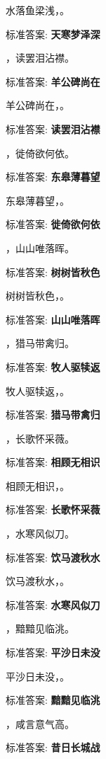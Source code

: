 \documentclass[12pt, a4paper, addpoints]{exam}
\begin{document}
\begin{questions}
\question[1] 水落鱼梁浅，\uline{\qquad\qquad\qquad}。

标准答案: \textbf{天寒梦泽深}

\question[1] \uline{\qquad\qquad\qquad}，读罢泪沾襟。

标准答案: \textbf{羊公碑尚在}

\question[1] 羊公碑尚在，\uline{\qquad\qquad\qquad}。

标准答案: \textbf{读罢泪沾襟}

\question[1] \uline{\qquad\qquad\qquad}，徙倚欲何依。

标准答案: \textbf{东皋薄暮望}

\question[1] 东皋薄暮望，\uline{\qquad\qquad\qquad}。

标准答案: \textbf{徙倚欲何依}

\question[1] \uline{\qquad\qquad\qquad}，山山唯落晖。

标准答案: \textbf{树树皆秋色}

\question[1] 树树皆秋色，\uline{\qquad\qquad\qquad}。

标准答案: \textbf{山山唯落晖}

\question[1] \uline{\qquad\qquad\qquad}，猎马带禽归。

标准答案: \textbf{牧人驱犊返}

\question[1] 牧人驱犊返，\uline{\qquad\qquad\qquad}。

标准答案: \textbf{猎马带禽归}

\question[1] \uline{\qquad\qquad\qquad}，长歌怀采薇。

标准答案: \textbf{相顾无相识}

\question[1] 相顾无相识，\uline{\qquad\qquad\qquad}。

标准答案: \textbf{长歌怀采薇}

\question[1] \uline{\qquad\qquad\qquad}，水寒风似刀。

标准答案: \textbf{饮马渡秋水}

\question[1] 饮马渡秋水，\uline{\qquad\qquad\qquad}。

标准答案: \textbf{水寒风似刀}

\question[1] \uline{\qquad\qquad\qquad}，黯黯见临洮。

标准答案: \textbf{平沙日未没}

\question[1] 平沙日未没，\uline{\qquad\qquad\qquad}。

标准答案: \textbf{黯黯见临洮}

\question[1] \uline{\qquad\qquad\qquad}，咸言意气高。

标准答案: \textbf{昔日长城战}


\end{questions}
\end{document}

